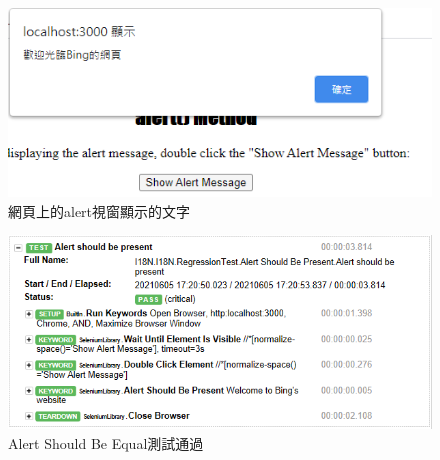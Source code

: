 \begin{figure}[H]
\includegraphics[width= \textwidth]{../論文截圖/4-1-2 alert視窗的文字.png}
\caption{網頁上的alert視窗顯示的文字}
\label{網頁上的alert視窗顯示的文字}
\end{figure}

\begin{figure}[H]
\includegraphics[width= \textwidth]{../論文截圖/4.1.1-3 pass.png}
\caption{Alert Should Be Equal測試通過}
\label{Alert Should Be Equal測試通過}
\end{figure}

\hspace*{\fill} \\
\\ \hspace*{\fill} \\
\\ \hspace*{\fill} \\
\\ \hspace*{\fill} \\
\\ \hspace*{\fill} \\
